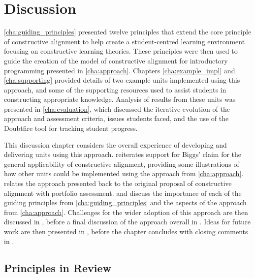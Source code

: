 
\chapter{Discussion} %
\label{cha:discussion}

\graphicspath{{Figures/Discussion/}}

\cref{cha:guiding_principles} presented twelve principles that extend the core principle of constructive alignment to help create a student-centred learning environment focusing on constructive learning theories. These principles were then used to guide the creation of the model of constructive alignment for introductory programming presented in \cref{cha:approach}. Chapters \ref{cha:example_impl} and \ref{cha:supporting} provided details of two example units implemented using this approach, and some of the supporting resources used to assist students in constructing appropriate knowledge. Analysis of results from these units was presented in \cref{cha:evaluation}, which discussed the iterative evolution of the approach and assessment criteria, issues students faced, and the use of the Doubtfire tool for tracking student progress. 

This discussion chapter considers the overall experience of developing and delivering units using this approach.  reiterates support for Biggs' claim for the general applicability of constructive alignment, providing some illustrations of how other units could be implemented using the approach from \cref{cha:approach}.  relates the approach presented back to the original proposal of constructive alignment with portfolio assessment.  and  discuss the importance of each of the guiding principles from \cref{cha:guiding_principles} and the aspects of the approach from \cref{cha:approach}. Challenges for the wider adoption of this approach are then discussed in , before a final discussion of the approach overall in . Ideas for future work are then presented in , before the chapter concludes with closing comments in .

\clearpage

\section{Principles in Review} %
\label{sec:principles_in_review}

